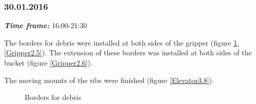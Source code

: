 \subsubsection{30.01.2016}
\textit{\textbf{Time frame:}} 16:00-21:30

The borders for debris were installed at both sides of the gripper (figure \ref{Gripper2.4}, \ref{Gripper2.5}). The extension of these borders was installed at both sides of the bucket (figure \ref{Gripper2.6}).

The moving mounts of the ribs were finished (figure \ref{Elevator3.8}).

\begin{figure}[H]
	\begin{minipage}[h]{0.47\linewidth}
		\caption{Borders for debris}
		\label{Gripper2.4}
	\end{minipage}
	\hfill
	\begin{minipage}[h]{0.47\linewidth}

\end{minipage}
\end{figure}
